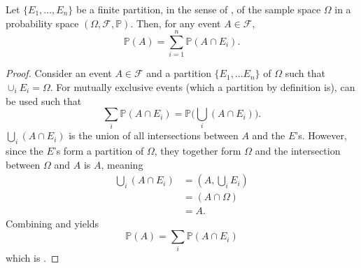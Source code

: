 \begin{theorem}
	\label{theorem:law_of_total_probability}
	Let $\{E_1, \dots, E_n\}$ be a finite partition, in the sense of , of the sample space $\Omega$ in a probability space $(\Omega, \mathcal{F}, \mathbb{P})$. Then, for any event $A \in \mathcal{F}$,
	\begin{equation}
		\mathbb{P}(A) = \sum_{i=1}^n \mathbb{P}(A \cap E_i).
		\label{eq:law_total_probability}
	\end{equation}
\end{theorem}

\begin{proof}
	Consider an event $A\in \mathcal{F}$ and a partition $\{E_1,\dots E_n\}$ of $\Omega$ such that $\cup_{i}E_i=\Omega$. For mutually exclusive events (which a partition by definition is),  can be used such that
	\begin{equation}
		\sum_{i}\mathbb{P}(A \cap E_i) = \mathbb{P}\bigg(\bigcup_{i}(A \cap E_i)\bigg).
		\label{eq:qq1}
	\end{equation} 
	$\bigcup_{i}(A \cap E_i)$ is the union of all intersections between $A$ and the $E$'s. However, since the $E$'s form a partition of $\Omega$, they together form $\Omega$ and the intersection between $\Omega$ and $A$ is $A$, meaning
	\begin{equation}
		\begin{split}
			\bigcup_{i}(A \cap E_i)  &= (A,\bigcup_{i}E_i)\\
			&= (A \cap \Omega)\\
			& =A.
		\end{split}
		\label{eq:qq2}
	\end{equation}
	Combining  and  yields
	\begin{equation}
		\mathbb{P}(A) = \sum_{i} \mathbb{P}(A \cap E_i)
	\end{equation}
	which is .
\end{proof}

